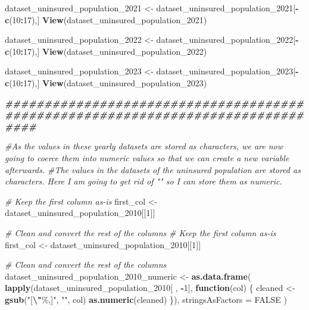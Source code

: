\documentclass[
]{article}
\newenvironment{Shaded}{\begin{snugshade}}{\end{snugshade}}
\newcommand{\AttributeTok}[1]{\textcolor[rgb]{0.13,0.29,0.53}{#1}}
\newcommand{\CommentTok}[1]{\textcolor[rgb]{0.56,0.35,0.01}{\textit{#1}}}
\newcommand{\ConstantTok}[1]{\textcolor[rgb]{0.56,0.35,0.01}{#1}}
\newcommand{\ControlFlowTok}[1]{\textcolor[rgb]{0.13,0.29,0.53}{\textbf{#1}}}
\newcommand{\DecValTok}[1]{\textcolor[rgb]{0.00,0.00,0.81}{#1}}
\newcommand{\DocumentationTok}[1]{\textcolor[rgb]{0.56,0.35,0.01}{\textbf{\textit{#1}}}}
\newcommand{\FunctionTok}[1]{\textcolor[rgb]{0.13,0.29,0.53}{\textbf{#1}}}
\newcommand{\NormalTok}[1]{#1}
\newcommand{\OtherTok}[1]{\textcolor[rgb]{0.56,0.35,0.01}{#1}}
\newcommand{\SpecialCharTok}[1]{\textcolor[rgb]{0.81,0.36,0.00}{\textbf{#1}}}
\newcommand{\StringTok}[1]{\textcolor[rgb]{0.31,0.60,0.02}{#1}}
\begin{document}
\begin{Shaded}
\begin{Highlighting}[]
\NormalTok{dataset\_uninsured\_population\_2021 }\OtherTok{\textless{}{-}}\NormalTok{ dataset\_uninsured\_population\_2021[}\SpecialCharTok{{-}}\FunctionTok{c}\NormalTok{(}\DecValTok{10}\SpecialCharTok{:}\DecValTok{17}\NormalTok{),]}
\FunctionTok{View}\NormalTok{(dataset\_uninsured\_population\_2021)}

\NormalTok{dataset\_uninsured\_population\_2022 }\OtherTok{\textless{}{-}}\NormalTok{ dataset\_uninsured\_population\_2022[}\SpecialCharTok{{-}}\FunctionTok{c}\NormalTok{(}\DecValTok{10}\SpecialCharTok{:}\DecValTok{17}\NormalTok{),]}
\FunctionTok{View}\NormalTok{(dataset\_uninsured\_population\_2022)}

\NormalTok{dataset\_uninsured\_population\_2023 }\OtherTok{\textless{}{-}}\NormalTok{ dataset\_uninsured\_population\_2023[}\SpecialCharTok{{-}}\FunctionTok{c}\NormalTok{(}\DecValTok{10}\SpecialCharTok{:}\DecValTok{17}\NormalTok{),]}
\FunctionTok{View}\NormalTok{(dataset\_uninsured\_population\_2023)}

\DocumentationTok{\#\#\#\#\#\#\#\#\#\#\#\#\#\#\#\#\#\#\#\#\#\#\#\#\#\#\#\#\#\#\#\#\#\#\#\#\#\#\#\#\#\#\#\#\#\#\#\#\#\#\#\#\#\#\#\#\#\#\#\#\#\#\#\#\#\#\#\#\#\#\#\#\#\#\#\#\#\#\#\#}

\CommentTok{\#As the values in these yearly datasets are stored as characters, we are now going to coerce them into numeric values so that we can create a new variable afterwards.}
\CommentTok{\#The values in the datasets of the uninsured population are stored as characters. Here I am going to get rid of "" so I can store them as numeric.}

\CommentTok{\# Keep the first column as{-}is}
\NormalTok{first\_col }\OtherTok{\textless{}{-}}\NormalTok{ dataset\_uninsured\_population\_2010[[}\DecValTok{1}\NormalTok{]]}

\CommentTok{\# Clean and convert the rest of the columns}
\CommentTok{\# Keep the first column as{-}is}
\NormalTok{first\_col }\OtherTok{\textless{}{-}}\NormalTok{ dataset\_uninsured\_population\_2010[[}\DecValTok{1}\NormalTok{]]}

\CommentTok{\# Clean and convert the rest of the columns}
\NormalTok{dataset\_uninsured\_population\_2010\_numeric }\OtherTok{\textless{}{-}} \FunctionTok{as.data.frame}\NormalTok{(}
  \FunctionTok{lapply}\NormalTok{(dataset\_uninsured\_population\_2010[ , }\SpecialCharTok{{-}}\DecValTok{1}\NormalTok{], }\ControlFlowTok{function}\NormalTok{(col) \{}
\NormalTok{    cleaned }\OtherTok{\textless{}{-}} \FunctionTok{gsub}\NormalTok{(}\StringTok{"[}\SpecialCharTok{\textbackslash{}"}\StringTok{\%,]"}\NormalTok{, }\StringTok{""}\NormalTok{, col)}
    \FunctionTok{as.numeric}\NormalTok{(cleaned)}
\NormalTok{  \}),}
  \AttributeTok{stringsAsFactors =} \ConstantTok{FALSE}
\NormalTok{)}


\end{Highlighting}
\end{Shaded}
\end{document}

